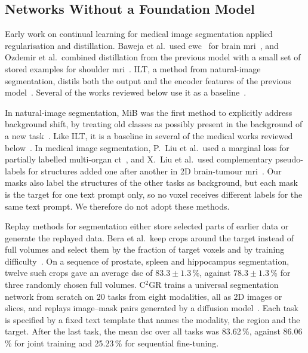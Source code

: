 \subsection{Networks Without a Foundation Model}
\label{subsec:cl-medseg-net}

Early work on continual learning for medical image segmentation applied regularisation and distillation.
Baweja et al.\ used \gls{ewc}~\cite{Kirkpatrick_2017} for brain \gls{mri}~\cite{baweja2018continuallearningmedicalimaging}, and Ozdemir et al.\ combined distillation from the previous model with a small set of stored examples for shoulder \gls{mri}~\cite{Ozdemir_2018}.
ILT, a method from natural-image segmentation, distils both the output and the encoder features of the previous model~\cite{michieli2019incrementallearningtechniquessemantic}.
Several of the works reviewed below use it as a baseline~\cite{ji2023continualsegmentsingleunified,liu2024universalextensible}.

In natural-image segmentation, MiB was the first method to explicitly address background shift, by treating old classes as possibly present in the background of a new task~\cite{cermelli2020modelingbackgroundincrementallearning}.
Like ILT, it is a baseline in several of the medical works reviewed below~\cite{ji2023continualsegmentsingleunified,gonzalez2023lifelong}.
In medical image segmentation, P.~Liu et al.\ used a marginal loss for partially labelled multi-organ \gls{ct}~\cite{liu2022learningincrementallysegmentmultiple}, and X.~Liu et al.\ used complementary pseudo-labels for structures added one after another in 2D brain-tumour \gls{mri}~\cite{liu2023incrementallearningheterogeneousstructure}.
Our masks also label the structures of the other tasks as background, but each mask is the target for one text prompt only, so no voxel receives different labels for the same text prompt.
We therefore do not adopt these methods.

Replay methods for segmentation either store selected parts of earlier data or generate the replayed data.
Bera et al.\ keep crops around the target instead of full volumes and select them by the fraction of target voxels and by training difficulty~\cite{memory_replay_cropping}.
On a sequence of prostate, spleen and hippocampus segmentation, twelve such crops gave an average \gls{dsc} of $83.3 \pm 1.3$\,\%, against $78.3 \pm 1.3$\,\% for three randomly chosen full volumes.
C$^2$GR trains a universal segmentation network from scratch on 20 tasks from eight modalities, all as 2D images or slices, and replays image--mask pairs generated by a diffusion model~\cite{li2026c2gr}.
Each task is specified by a fixed text template that names the modality, the region and the target.
After the last task, the mean \gls{dsc} over all tasks was 83.62\,\%, against 86.06\,\% for joint training and 25.23\,\% for sequential fine-tuning.

